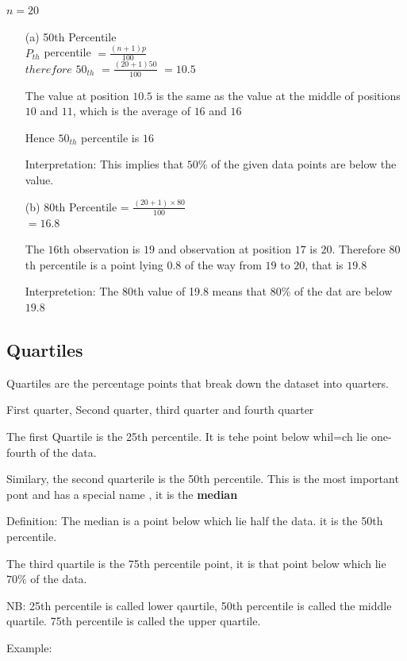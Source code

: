 \documentclass[12pt]{article}
\begin{document}
$n = 20$

\begin{enumerate}
    \item[(a)]50th Percentile \\ $P_{th}$ percentile $= \frac{(n + 1)p}{100}$\\
    $therefore$ $50_{th}$ $= \frac{(20 + 1)50}{100}$
    $= 10.5$

    The value at position $10.5$ is the same as the value at the middle of positions $10$ and $11$, which is the average of $16$ and $16$

    Hence $50_{th}$ percentile is $16$

    Interpretation: This implies that $50\%$ of the given data points are below the value.
    \item[(b)] 80th Percentile = $\frac{(20 + 1)\times 80}{100}$ \\ $= 16.8$

        The $16$th observation is $19$ and observation at position $17$ is $20$. Therefore $80$th percentile is a point lying $0.8$ of the way from $19$ to $20$, that is $19.8$

        Interpretetion: The $80$th value of 19.8 means that $80\%$ of the dat are below $19.8$
\end{enumerate}

\subsection{Quartiles}
Quartiles are the percentage points that break down the dataset into quarters.

First quarter, Second quarter, third quarter and fourth quarter

The first Quartile is the 25th percentile. It is tehe point below whil=ch lie one-fourth of the data.

Similary, the second quarterile is the 50th percentile. This is the most important pont and has a special name , it is the \textbf{median}

Definition: The median is a point below which lie half the data. it is the 50th percentile.

The third quartile is the 75th percentile point, it is that point below which lie $70\%$ of the data.

NB: 25th percentile is called lower qaurtile, 50th percentile is called the middle quartile. 75th percentile is called the upper quartile.

Example:
\end{document}
